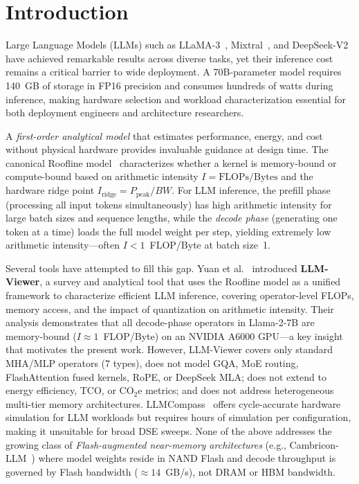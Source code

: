 \documentclass[journal]{IEEEtran}
\begin{document}
\section{Introduction}
\label{sec:intro}

Large Language Models (LLMs) such as LLaMA-3~\cite{llama3},
Mixtral~\cite{mixtral}, and DeepSeek-V2~\cite{deepseekv2} have achieved
remarkable results across diverse tasks, yet their inference cost remains
a critical barrier to wide deployment.
A 70B-parameter model requires 140~GB of storage in FP16 precision and
consumes hundreds of watts during inference, making hardware selection and
workload characterization essential for both deployment engineers and
architecture researchers.

A \emph{first-order analytical model} that estimates performance, energy,
and cost without physical hardware provides invaluable guidance at design
time. The canonical Roofline model~\cite{roofline} characterizes whether
a kernel is memory-bound or compute-bound based on arithmetic intensity
$I = \text{FLOPs}/\text{Bytes}$ and the hardware ridge point
$I_\text{ridge} = P_\text{peak}/BW$.
For LLM inference, the prefill phase (processing all input tokens
simultaneously) has high arithmetic intensity for large batch sizes and
sequence lengths, while the \emph{decode phase} (generating one token at a
time) loads the full model weight per step, yielding extremely low
arithmetic intensity---often $I < 1$~FLOP/Byte at batch size~1.

Several tools have attempted to fill this gap.
Yuan et al.~\cite{llmviewer} introduced \textbf{LLM-Viewer}, a survey and
analytical tool that uses the Roofline model as a unified framework to
characterize efficient LLM inference, covering operator-level FLOPs,
memory access, and the impact of quantization on arithmetic intensity.
Their analysis demonstrates that all decode-phase operators in Llama-2-7B
are memory-bound ($I \approx 1$~FLOP/Byte) on an NVIDIA A6000 GPU---a key
insight that motivates the present work.
However, LLM-Viewer covers only standard MHA/MLP operators (7 types),
does not model GQA, MoE routing, FlashAttention fused kernels, RoPE, or
DeepSeek MLA; does not extend to energy efficiency, TCO, or CO$_2$e
metrics; and does not address heterogeneous multi-tier memory architectures.
LLMCompass~\cite{llmcompass} offers cycle-accurate hardware simulation for
LLM workloads but requires hours of simulation per configuration,
making it unsuitable for broad DSE sweeps.
None of the above addresses the growing class of
\emph{Flash-augmented near-memory architectures}
(e.g., Cambricon-LLM~\cite{cambriconllm}) where model weights reside in
NAND Flash and decode throughput is governed by Flash bandwidth
(${\approx}14$~GB/s), not DRAM or HBM bandwidth.
\end{document}

